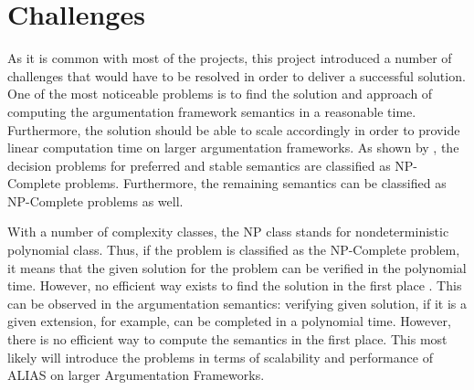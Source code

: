 \section{Challenges}
As it is common with most of the projects, this project introduced a number of challenges that would have to be resolved in order to deliver a successful solution. One of the most noticeable problems is to find the solution and approach of computing the argumentation framework semantics in a reasonable time. Furthermore, the solution should be able to scale accordingly in order to provide linear computation time on larger argumentation frameworks. As shown by \citet{complexity}, the decision problems for preferred and stable semantics are classified as NP-Complete problems. Furthermore, the remaining semantics can be classified as NP-Complete problems as well.

With a number of complexity classes, the NP class stands for nondeterministic polynomial class. Thus, if the problem is classified as the NP-Complete problem, it means that the given solution for the problem can be verified in the polynomial time. However, no efficient way exists to find the solution in the first place \citep{arora2009computational}. This can be observed in the argumentation semantics: verifying given solution, if it is a given extension, for example, can be completed in a polynomial time. However, there is no efficient way to compute the semantics in the first place. This most likely will introduce the problems in terms of scalability and performance of ALIAS on larger Argumentation Frameworks. 